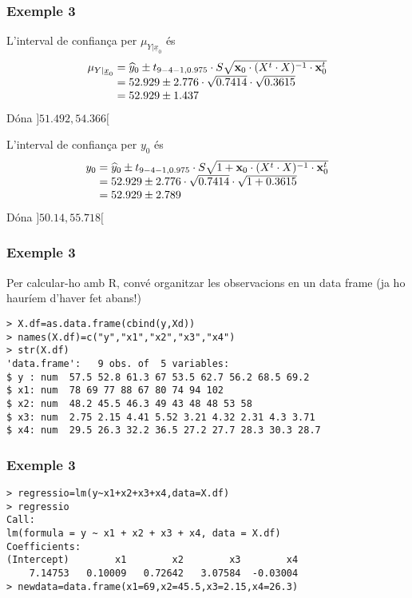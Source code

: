 \documentclass[12pt,t]{beamer}
\theoremstyle{plain}
\theoremstyle{definition}
\begin{document}
\begin{frame}
\frametitle{Exemple 3}
L'interval de confiança per $\mu_{Y|\underline{x}_0}$ és
$$
\begin{array}{l}
\mu_{Y|\underline{x}_0}=\widehat{y}_0\pm t_{9-4-1,0.975}\cdot S\sqrt{\mathbf{x}_0\cdot(X^t  \cdot X)^{-1}\cdot \mathbf{x}_0^t}\\
\hphantom{\mu_{Y|\underline{x}_0}}=52.929\pm 2.776\cdot \sqrt{0.7414}\cdot \sqrt{0.3615}\\
\hphantom{\mu_{Y|\underline{x}_0}}=52.929\pm 1.437
\end{array}
$$
Dóna $]51.492,54.366[$
\medskip

L'interval de confiança per $y_0$ és
$$
\begin{array}{l}
y_0=\widehat{y}_0\pm t_{9-4-1,0.975}\cdot S\sqrt{1+\mathbf{x}_0\cdot(X^t  \cdot X)^{-1}\cdot \mathbf{x}_0^t}\\
\hphantom{y_0}=52.929\pm 2.776\cdot \sqrt{0.7414}\cdot \sqrt{1+0.3615}\\
\hphantom{y_0}=52.929\pm 2.789
\end{array}
$$
Dóna $]50.14, 55.718[$
\end{frame}

\begin{frame}[fragile]
\frametitle{Exemple 3}

Per calcular-ho amb R, convé organitzar les observacions en un data frame (ja ho hauríem d'haver fet abans!)
{\footnotesize \begin{verbatim}
> X.df=as.data.frame(cbind(y,Xd))
> names(X.df)=c("y","x1","x2","x3","x4")
> str(X.df)
'data.frame':	9 obs. of  5 variables:
$ y : num  57.5 52.8 61.3 67 53.5 62.7 56.2 68.5 69.2
$ x1: num  78 69 77 88 67 80 74 94 102
$ x2: num  48.2 45.5 46.3 49 43 48 48 53 58
$ x3: num  2.75 2.15 4.41 5.52 3.21 4.32 2.31 4.3 3.71
$ x4: num  29.5 26.3 32.2 36.5 27.2 27.7 28.3 30.3 28.7
\end{verbatim}
}
\end{frame}

\begin{frame}[fragile]
\frametitle{Exemple 3}
\vspace*{-2ex}
\small

\begin{verbatim}
> regressio=lm(y~x1+x2+x3+x4,data=X.df)
> regressio
Call:
lm(formula = y ~ x1 + x2 + x3 + x4, data = X.df)
Coefficients:
(Intercept)        x1        x2        x3        x4  
    7.14753   0.10009   0.72642   3.07584  -0.03004  
> newdata=data.frame(x1=69,x2=45.5,x3=2.15,x4=26.3)
\end{verbatim}

\end{frame}
\end{document}
